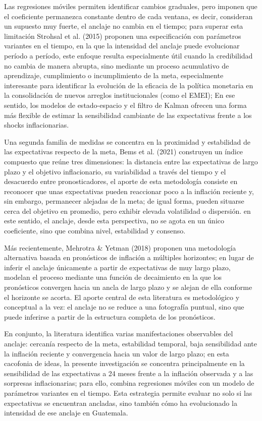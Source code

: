 \documentclass[
  10.5pt,
  letterpaper,
  twocolumn]{article}
\begin{document}
Las regresiones móviles permiten identificar cambios graduales, pero
imponen que el coeficiente permanezca constante dentro de cada ventana,
es decir, consideran un supuesto muy fuerte, el anclaje no cambia en el
tiempo; para superar esta limitación Strohsal et al. (2015) proponen una
especificación con parámetros variantes en el tiempo, en la que la
intensidad del anclaje puede evolucionar período a período, este enfoque
resulta especialmente útil cuando la credibilidad no cambia de manera
abrupta, sino mediante un proceso acumulativo de aprendizaje,
cumplimiento o incumplimiento de la meta, especialmente interesante para
identificar la evolución de la eficacia de la política monetaria en la
consolidación de nuevos arreglos institucionales (como el EMEI); En ese
sentido, los modelos de estado-espacio y el filtro de Kalman ofrecen una
forma más flexible de estimar la sensibilidad cambiante de las
expectativas frente a los shocks inflacionarias.

Una segunda familia de medidas se concentra en la proximidad y
estabilidad de las expectativas respecto de la meta, Bems et al. (2021)
construyen un índice compuesto que reúne tres dimensiones: la distancia
entre las expectativas de largo plazo y el objetivo inflacionario, su
variabilidad a través del tiempo y el desacuerdo entre pronosticadores,
el aporte de esta metodología consiste en reconocer que unas
expectativas pueden reaccionar poco a la inflación reciente y, sin
embargo, permanecer alejadas de la meta; de igual forma, pueden situarse
cerca del objetivo en promedio, pero exhibir elevada volatilidad o
dispersión. en este sentido, el anclaje, desde esta perspectiva, no se
agota en un único coeficiente, sino que combina nivel, estabilidad y
consenso.

Más recientemente, Mehrotra \& Yetman (2018) proponen una metodología
alternativa basada en pronósticos de inflación a múltiples horizontes;
en lugar de inferir el anclaje únicamente a partir de expectativas de
muy largo plazo, modelan el proceso mediante una función de decaimiento
en la que los pronósticos convergen hacia un ancla de largo plazo y se
alejan de ella conforme el horizonte se acorta. El aporte central de
esta literatura es metodológico y conceptual a la vez: el anclaje no se
reduce a una fotografía puntual, sino que puede inferirse a partir de la
estructura completa de los pronósticos.

En conjunto, la literatura identifica varias manifestaciones observables
del anclaje: cercanía respecto de la meta, estabilidad temporal, baja
sensibilidad ante la inflación reciente y convergencia hacia un valor de
largo plazo; en esta cacofonia de ideas, la presente investigación se
concentra principalmente en la sensibilidad de las expectativas a 24
meses frente a la inflación observada y a las sorpresas inflacionarias;
para ello, combina regresiones móviles con un modelo de parámetros
variantes en el tiempo. Esta estrategia permite evaluar no solo si las
expectativas se encuentran ancladas, sino también cómo ha evolucionado
la intensidad de ese anclaje en Guatemala.
\end{document}
